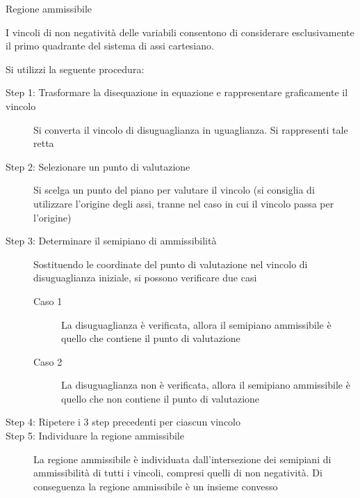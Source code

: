 \documentclass{beamer}
\begin{document}
\begin{frame}[allowframebreaks]{Regione ammissibile}
\scriptsize{
I vincoli di non negativit\`a delle variabili consentono di considerare esclusivamente il
primo quadrante del sistema di assi cartesiano.

Si utilizzi la seguente procedura:
\begin{description}

\item[Step 1: Trasformare la disequazione in equazione e rappresentare graficamente il vincolo] 
Si converta il vincolo di disuguaglianza in uguaglianza. Si rappresenti %
tale retta

\item[Step 2: Selezionare un punto di valutazione]

Si scelga un punto del piano per valutare il vincolo (si consiglia di utilizzare 
l'origine degli assi, tranne nel caso in cui il vincolo passa per l'origine)

\item[Step 3: Determinare il semipiano di ammissibilit\`a]

Sostituendo le coordinate del punto di valutazione nel vincolo di disuguaglianza iniziale, si
possono verificare due casi

\begin{description}
\item[Caso 1]
La disuguaglianza \`e verificata, allora il semipiano ammissibile \`e quello che
contiene il punto di valutazione

\item[Caso 2]
La disuguaglianza non \`e verificata, allora il semipiano ammissibile \`e quello
che non contiene il punto di valutazione
\end{description}
\end{description}
}

\framebreak

\begin{description}
\item[Step 4: Ripetere i 3 step precedenti per ciascun vincolo]

\item[Step 5: Individuare la regione ammissibile]
La regione ammissibile \`e individuata dall’intersezione dei semipiani di ammissibilit\`a di tutti i 
vincoli, compresi quelli di non negativit\`a. Di conseguenza la regione ammissibile \`e un insieme 
convesso
\end{description}
\end{frame}
\end{document}
